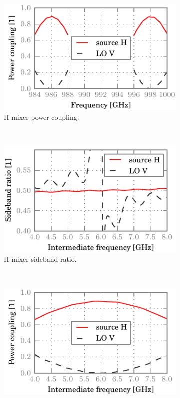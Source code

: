 \begin{figure}[hbtp]
    \centering
    \begin{subfigure}[b]{.5\textwidth}
        \includegraphics{chapter_3/05_mh_cocr_h_dsb}%
        \caption{H mixer power coupling.}
    \end{subfigure}%
    \\
    \begin{subfigure}[b]{.5\textwidth}
        \includegraphics{chapter_3/05_mh_cocr_h_sbr}%
        \caption{H mixer sideband ratio.}
    \end{subfigure}%
    \\
    \begin{subfigure}[b]{.5\textwidth}
        \includegraphics{chapter_3/05_mh_cocr_h_ssb}%

\end{subfigure}
\end{figure}
